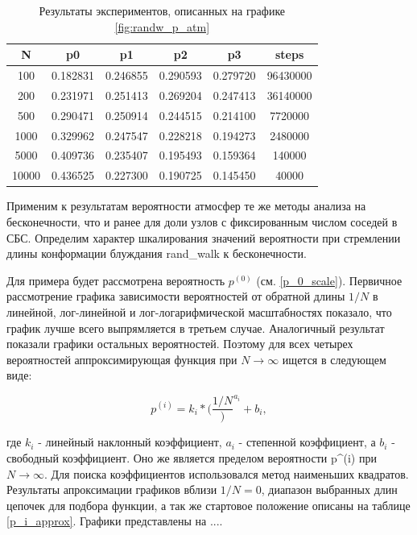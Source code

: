 \begin{table}[h]
\centering
\begin{tabular}{|c|c|c|c|c|c|}
\hline
N & p0 & p1 & p2 & p3 & steps \\ \hline
100 & 0.182831 & 0.246855 & 0.290593 & 0.279720 & 96430000 \\ \hline 
200 & 0.231971 & 0.251413 & 0.269204 & 0.247413 & 36140000 \\ \hline
500 & 0.290471 & 0.250914 & 0.244515 & 0.214100 & 7720000 \\ \hline
1000 & 0.329962 & 0.247547 & 0.228218 & 0.194273 & 2480000 \\ \hline
5000 & 0.409736 & 0.235407 & 0.195493 & 0.159364 & 140000 \\ \hline
10000 & 0.436525 & 0.227300 & 0.190725 & 0.145450 & 40000 \\ \hline
\end{tabular}
\caption{Результаты экспериментов, описанных на графике \ref{fig:randw_p_atm}}
\label{tab:randw_p_atm}
\end{table}

Применим к результатам вероятности атмосфер те же методы анализа на бесконечности, что и ранее для доли узлов с фиксированным числом соседей в СБС.
Определим характер шкалирования значений вероятности при стремлении длины конформации блуждания rand\_walk к бесконечности.

Для примера будет рассмотрена вероятность $p^{(0)}$ (см. \ref{p_0_scale}). 
Первичное рассмотрение графика зависимости вероятностей от обратной длины $1/N$ в линейной, лог-линейной и лог-логарифмической масштабностях показало, что график лучше всего выпрямляется в третьем случае. 
Аналогичный результат показали графики остальных вероятностей.
Поэтому для всех четырех вероятностей аппроксимирующая функция при $N \to \infty$ ищется в следующем виде:

\begin{equation}
p^{(i)} = k_i * (\frac{1/N})^{a_i} + b_i,
\end{equation}

где $k_i$ - линейный наклонный коэффициент, $a_i$ - степенной коэффициент, а $b_i$ - свободный коэффициент. 
Оно же является пределом вероятности p^{(i)} при $N \to \infty$.
Для поиска коэффициентов использовался метод наименьших квадратов.
Результаты апроксимации графиков вблизи $1/N = 0$, диапазон выбранных длин цепочек для подбора функции, а так же стартовое положение описаны на таблице \ref{p_i_approx}. 
Графики представлены на ....


